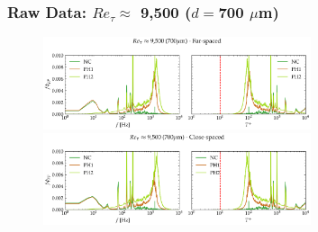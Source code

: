 \documentclass[aspectratio=169,9pt]{beamer}
\begin{document}




\begin{frame}
  \frametitle{Raw Data: $Re_\tau \approx$ 9,500 ($d=$700 $\mu$m)}
  \begin{figure}
    \centering
    \includegraphics[width=0.7\textwidth]{raw_spectra/700_100psi_raw_spec_far.png}
    \includegraphics[width=0.7\textwidth]{raw_spectra/700_100psi_raw_spec_close.png}
  \end{figure}
\end{frame}


\end{document}
